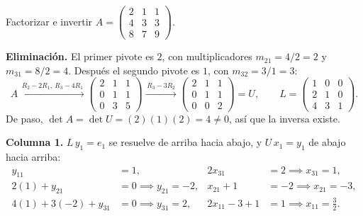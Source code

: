 \documentclass[11pt,letterpaper]{article}
\begin{document}
\begin{ejemplo}
    Factorizar e invertir
    $A = \begin{pmatrix} 2 & 1 & 1 \\ 4 & 3 & 3 \\ 8 & 7 & 9
    \end{pmatrix}$.

    \textbf{Eliminación.} El primer pivote es $2$, con multiplicadores
    $m_{21} = 4/2 = 2$ y $m_{31} = 8/2 = 4$. Después el segundo
    pivote es $1$, con $m_{32} = 3/1 = 3$:
    \[
        A
        \xrightarrow{\,R_2 - 2R_1,\ R_3 - 4R_1\,}
        \begin{pmatrix} 2 & 1 & 1 \\ 0 & 1 & 1 \\ 0 & 3 & 5
        \end{pmatrix}
        \xrightarrow{\,R_3 - 3R_2\,}
        \begin{pmatrix} 2 & 1 & 1 \\ 0 & 1 & 1 \\ 0 & 0 & 2
        \end{pmatrix} = U ,
        \qquad
        L = \begin{pmatrix} 1 & 0 & 0 \\ 2 & 1 & 0 \\ 4 & 3 & 1
        \end{pmatrix} .
    \]
    De paso, $\det A = \det U = (2)(1)(2) = 4 \neq 0$, así que la
    inversa existe.

    \textbf{Columna 1.} $L\,y_1 = e_1$ se resuelve de arriba hacia
    abajo, y $U\,x_1 = y_1$ de abajo hacia arriba:
    \begin{align*}
        y_{11} &= 1 , &
        2x_{31} &= 2 \implies x_{31} = 1 , \\
        2(1) + y_{21} &= 0 \implies y_{21} = -2 , &
        x_{21} + 1 &= -2 \implies x_{21} = -3 , \\
        4(1) + 3(-2) + y_{31} &= 0 \implies y_{31} = 2 , &
        2x_{11} - 3 + 1 &= 1 \implies x_{11} = \tfrac{3}{2} .
    \end{align*}


\end{ejemplo}
\end{document}
